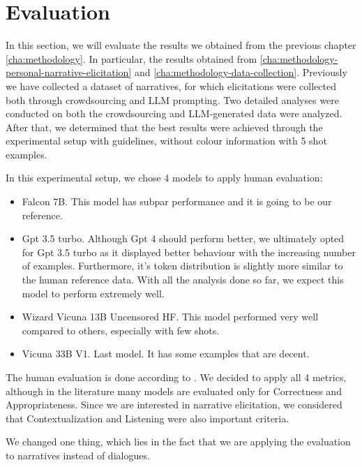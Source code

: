\chapter{Evaluation}
\label{cha:evaluation}

In this section, we will evaluate the results we obtained from the previous chapter \ref{cha:methodology}. In particular, the results obtained from \ref{cha:methodology-personal-narrative-elicitation} and \ref{cha:methodology-data-collection}. 
Previously we have collected a dataset of narratives, for which elicitations were collected both through crowdsourcing and LLM prompting.
Two detailed analyses were conducted on both the crowdsourcing and LLM-generated data were analyzed. 
After that, we determined that the best results were achieved through the experimental setup with guidelines, without colour information with 5 shot examples. 


In this experimental setup, we chose 4 models to apply human evaluation:
\begin{itemize}
    \item Falcon 7B. This model has subpar performance and it is going to be our reference.
    \item Gpt 3.5 turbo. Although Gpt 4 should perform better, we ultimately opted for Gpt 3.5 turbo as it displayed better behaviour with the increasing number of examples. Furthermore, it's token distribution is slightly more similar to the human reference data. With all the analysis done so far, we expect this model to perform extremely well.
    \item Wizard Vicuna 13B Uncensored HF. This model performed very well compared to others, especially with few shots.
    \item Vicuna 33B V1. Last model. It has some examples that are decent.
\end{itemize}

The human evaluation is done according to \cite{human}. We decided to apply all 4 metrics, although in the literature many models are evaluated only for Correctness and Appropriateness. Since we are interested in narrative elicitation, we considered that Contextualization and Listening were also important criteria. 

We changed one thing, which lies in the fact that we are applying the evaluation to narratives instead of dialogues.

